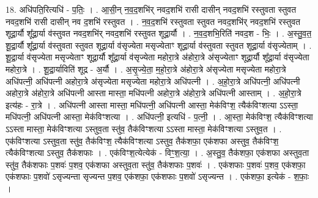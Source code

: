 \documentclass[17pt]{extarticle}
\begin{document}
18. अधि॑पति॒रित्यधि॑ - प॒तिः॒ । . आ॒सी॒न् न॒व॒द॒शभि॑र् नवद॒शभि॑ रासी दासीन् नवद॒शभि॑ रस्तुवता स्तुवत नवद॒शभि॑ रासी दासीन् नव द॒शभि॑ रस्तुवत । . न॒व॒द॒शभि॑ रस्तुवता स्तुवत नवद॒शभि॑र् नवद॒शभि॑ रस्तुवत शूद्रा॒र्यौ शू᳚द्रा॒र्या व॑स्तुवत नवद॒शभि॑र् नवद॒शभि॑ रस्तुवत शूद्रा॒र्यौ । . न॒व॒द॒शभि॒रिति॑ नवद॒श - भिः॒ । . अ॒स्तु॒व॒त॒ शू॒द्रा॒र्यौ शू᳚द्रा॒र्या व॑स्तुवता स्तुवत शूद्रा॒र्या व॑सृज्येता मसृज्येताꣳ शूद्रा॒र्या व॑स्तुवता स्तुवत शूद्रा॒र्या व॑सृज्येताम् । . शू॒द्रा॒र्या व॑सृज्येता मसृज्येताꣳ शूद्रा॒र्यौ शू᳚द्रा॒र्या व॑सृज्येता महोरा॒त्रे अ॑होरा॒त्रे अ॑सृज्येताꣳ शूद्रा॒र्यौ शू᳚द्रा॒र्या व॑सृज्येता महोरा॒त्रे । . शू॒द्रा॒र्याविति॑ शूद्र - अ॒र्यौ । . अ॒सृ॒ज्ये॒ता॒ म॒हो॒रा॒त्रे अ॑होरा॒त्रे अ॑सृज्येता मसृज्येता महोरा॒त्रे अधि॑पत्नी॒ अधि॑पत्नी अहोरा॒त्रे अ॑सृज्येता मसृज्येता महोरा॒त्रे अधि॑पत्नी । . अ॒हो॒रा॒त्रे अधि॑पत्नी॒ अधि॑पत्नी अहोरा॒त्रे अ॑होरा॒त्रे अधि॑पत्नी आस्ता मास्ता॒ मधि॑पत्नी अहोरा॒त्रे अ॑होरा॒त्रे अधि॑पत्नी आस्ताम् । . अ॒हो॒रा॒त्रे इत्य॑हः - रा॒त्रे । . अधि॑पत्नी आस्ता मास्ता॒ मधि॑पत्नी॒ अधि॑पत्नी आस्ता॒ मेक॑विꣳश॒ त्यैक॑विꣳशत्या ऽऽस्ता॒ मधि॑पत्नी॒ अधि॑पत्नी आस्ता॒ मेक॑विꣳशत्या । . अधि॑पत्नी॒ इत्यधि॑ - प॒त्नी॒ । . आ॒स्ता॒ मेक॑विꣳश॒ त्यैक॑विꣳशत्या ऽऽस्ता मास्ता॒ मेक॑विꣳशत्या ऽस्तुव॒ता स्तु॑व॒ तैक॑विꣳशत्या ऽऽस्ता मास्ता॒ मेक॑विꣳशत्या ऽस्तुव॒त । . एक॑विꣳशत्या ऽस्तुव॒ता स्तु॑व॒ तैक॑विꣳश॒ त्यैक॑विꣳशत्या ऽस्तुव॒ तैक॑शफा॒ एक॑शफा 
अस्तुव॒ तैक॑विꣳश॒ त्यैक॑विꣳशत्या ऽस्तुव॒ तैक॑शफाः । . एक॑विꣳश॒त्येत्येक॑ - विꣳ॒॒श॒त्या॒ । . अ॒स्तु॒व॒ तैक॑शफा॒ एक॑शफा अस्तुव॒ता स्तु॑व॒ तैक॑शफाः प॒शवः॑ प॒शव॒ एक॑शफा अस्तुव॒ता 
स्तु॑व॒ तैक॑शफाः प॒शवः॑ । . एक॑शफाः प॒शवः॑ प॒शव॒ एक॑शफा॒ एक॑शफाः प॒शवो॑ ऽसृज्यन्ता सृज्यन्त प॒शव॒ एक॑शफा॒ एक॑शफाः प॒शवो॑ ऽसृज्यन्त । . एक॑शफा॒ इत्येक॑ - श॒फाः॒ । \newline
\end{document}
